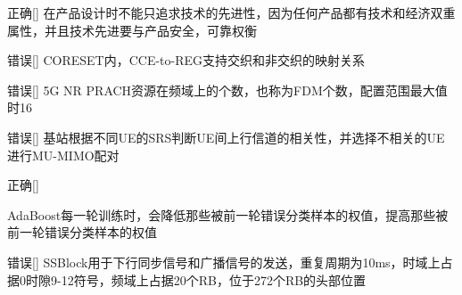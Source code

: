 \begin{choice}{\;正确\;}[]
    在产品设计时不能只追求技术的先进性，因为任何产品都有技术和经济双重属性，并且技术先进要与产品安全，可靠权衡
\end{choice}

\begin{choice}{\;错误\;}[]
    CORESET内，CCE-to-REG支持交织和非交织的映射关系

\end{choice}


\begin{choice}{\;错误\;}[]
    5G NR PRACH资源在频域上的个数，也称为FDM个数，配置范围最大值时16

\end{choice}

\begin{choice}{\;错误\;}[]
    基站根据不同UE的SRS判断UE间上行信道的相关性，并选择不相关的UE进行MU-MIMO配对

\end{choice}

\begin{choice}{\;正确\;}[]

    AdaBoost每一轮训练时，会降低那些被前一轮错误分类样本的权值，提高那些被前一轮错误分类样本的权值
\end{choice}


\begin{choice}{\;错误\;}[]
    SSBlock用于下行同步信号和广播信号的发送，重复周期为10ms，时域上占据0时隙9-12符号，频域上占据20个RB，位于272个RB的头部位置

\end{choice}











